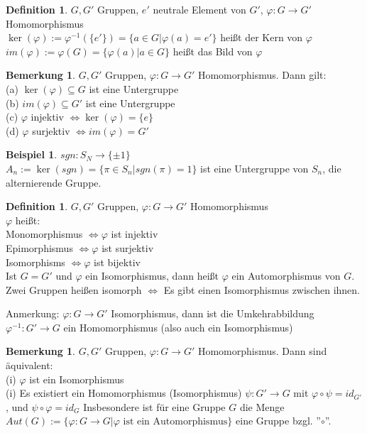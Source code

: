 \documentclass[10pt,a4paper,numbers=endperiod]{scrreprt}
\theoremstyle{definition}
\newtheorem{defi}[satz]{Definition}
\newtheorem{bem}[satz]{Bemerkung}
\newtheorem{bsp}[satz]{Beispiel}
\begin{document}
\begin{defi}
	$G, G'$ Gruppen, $e'$ neutrale Element von $G'$, $\varphi: G \rightarrow G'$ Homomorphismus\\
	$\ker(\varphi) := \varphi^{-1}(\{e'\}) = \{a \in G| \varphi(a) = e'\}$ heißt der Kern von $\varphi$\\
	$im(\varphi) := \varphi(G) = \{\varphi(a) | a \in G\}$ heißt das Bild von $\varphi$
\end{defi}

\begin{bem}
	$G, G'$ Gruppen, $\varphi: G \rightarrow G'$ Homomorphismus. Dann gilt:\\
	(a) $\ker(\varphi) \subseteq G$ ist eine Untergruppe\\
	(b) $im (\varphi) \subseteq G'$ ist eine Untergruppe\\
	(c) $\varphi$ injektiv $\Leftrightarrow \ker (\varphi) = \{e\}$\\
	(d) $\varphi$ surjektiv $\Leftrightarrow im(\varphi) = G'$
\end{bem}

\begin{bsp}
	$sgn: S_N \rightarrow \{\pm 1\}$\\
	$A_n := \ker(sgn) = \{ \pi \in S_n | sgn(\pi) = 1\}$ ist eine Untergruppe von $S_n$, die alternierende Gruppe.
\end{bsp}

\begin{defi}
	$G, G'$ Gruppen, $\varphi: G \rightarrow G'$ Homomorphismus\\
	$\varphi$ heißt:\\
	Monomorphismus $\Leftrightarrow \varphi$ ist injektiv\\
	Epimorphismus $\Leftrightarrow \varphi$ ist surjektiv\\
	Isomorphisms $\Leftrightarrow \varphi$ ist bijektiv\\
	Ist $G = G'$ und $\varphi$ ein Isomorphismus, dann heißt $\varphi$ ein Automorphismus von $G$. Zwei Gruppen heißen isomorph $\Leftrightarrow$ Es gibt einen Isomorphismus zwischen ihnen.
\end{defi}

Anmerkung: $\varphi: G \rightarrow G'$ Isomorphismus, dann ist die Umkehrabbildung $\varphi^{-1}: G' \rightarrow G$ ein Homomorphismus (also auch ein Isomorphismus)

\begin{bem}
	$G, G'$ Gruppen, $\varphi: G \rightarrow G'$ Homomorphismus. Dann sind äquivalent:\\
	(i) $\varphi$ ist ein Isomorphismus\\
	(i) Es existiert ein Homomorphismus (Isomorphismus) $\psi: G' \rightarrow G$ mit $\varphi \circ \psi = id_{G'}$, und $\psi \circ \varphi = id_G$ Insbesondere ist für eine Gruppe $G$ die Menge $Aut(G) := \{\varphi: G \rightarrow G| \varphi \text{ ist ein Automorphismus}\}$ eine Gruppe bzgl. ''$\circ$''.
\end{bem}
\end{document}
